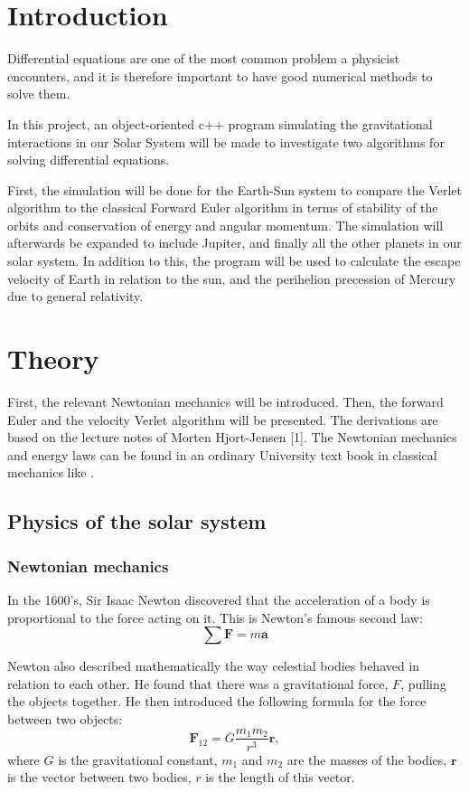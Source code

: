 \documentclass[10pt,a4paper,titlepage]{article}
\begin{document}
\section{Introduction}
Differential equations are one of the most common problem a physicist encounters, and it is therefore important to have good numerical methods to solve them. 
	
In this project, an object-oriented c++ program simulating the gravitational interactions in our Solar System will be made to investigate two algorithms for solving differential equations. 

First, the simulation will be done for the Earth-Sun system to compare the Verlet algorithm to the classical Forward Euler algorithm in terms of stability of the orbits and conservation of energy and angular momentum. The simulation will afterwards be expanded to include Jupiter, and finally all the other planets in our solar system. In addition to this, the program will be used to calculate the escape velocity of Earth in relation to the sun, and the perihelion precession of Mercury due to general relativity. 


\section{Theory}
First, the relevant Newtonian mechanics will be introduced. Then, the forward Euler and the velocity Verlet algorithm will be presented. The derivations are based on the lecture notes of Morten Hjort-Jensen [1]. The Newtonian mechanics and energy laws can be found in an ordinary University text book in classical mechanics like \cite{physics}. 
\subsection{Physics of the solar system} 
\subsubsection{Newtonian mechanics}
In the 1600's, Sir Isaac Newton discovered that the acceleration of a body is proportional to the force acting on it. This is Newton's famous second law:
\begin{equation}
\label{eq:newt_2}
\sum\mathbf{F} = m\mathbf{a}
\end{equation}


Newton also described mathematically the way celestial bodies behaved in relation to each other. He found that there was a gravitational force, $F$, pulling the objects together. He then introduced the following formula for the force between two objects:
\begin{equation}
\mathbf{F}_{12}=G\frac{m_{1}m_{2}}{r^3}\mathbf{r},
\end{equation}
where $G$ is the gravitational constant, $m_1$ and $m_2$ are the masses of the bodies, $\mathbf{r}$ is the vector between two bodies, $r$ is the length of this vector. 
\end{document}
